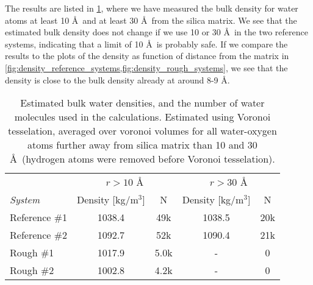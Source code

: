 The results are listed in \cref{tab:bulk_water_density}, where we have measured the bulk density for water atoms at least 10 \AA\ and at least 30 \AA\ from the silica matrix. We see that the estimated bulk density does not change if we use 10 or 30 \AA\ in the two reference systems, indicating that a limit of 10 \AA\ is probably safe. If we compare the results to the plots of the density as function of distance from the matrix in \cref{fig:density_reference_systems,fig:density_rough_systems}, we see that the density is close to the bulk density already at around 8-9 \AA.
%
\begin{table}[!htb]%
    \centering%
    \begin{tabular}{l|cc|cc}%
    ~               & \multicolumn{2}{c|}{$r>10$ \AA}& \multicolumn{2}{c}{$r>30$ \AA}    \\
    \textit{System} & Density [kg/m$^3$]    & N     & Density [kg/m$^3$]    & N   \\ \hline
    Reference \#1   & 1038.4                & 49k   & 1038.5                & 20k \\
    Reference \#2   & 1092.7                & 52k   & 1090.4                & 21k \\
    Rough \#1       & 1017.9                & 5.0k  & -                     & 0   \\
    Rough \#2       & 1002.8                & 4.2k  & -                     & 0   \\
    \end{tabular}%
    \vspace{8pt}%
    \caption{%
        Estimated bulk water densities, and the number of water molecules used in the calculations. Estimated using Voronoi tesselation, averaged over voronoi volumes for all water-oxygen atoms further away from silica matrix than 10 and 30 \AA\ (hydrogen atoms were removed before Voronoi tesselation). %
        \label{tab:bulk_water_density}%
    }%
\end{table}%

